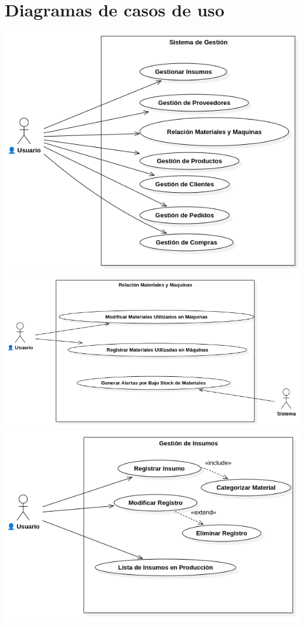 \documentclass{article}
\begin{document}
\section{Diagramas de casos de uso}
	\begin{center}
		\includegraphics[width=0.7\linewidth]{imagenes/sistema_de_gestion.png}\\
		\includegraphics[width=0.7\linewidth]{imagenes/relacion_meteriales_maquinas.png}\\
		\includegraphics[width=0.7\linewidth]{imagenes/gestion_de_insumos.png}
	\end{center}
\end{document}
